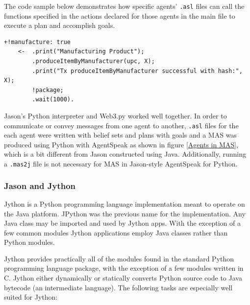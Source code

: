 \vspace{.5cm}

The code sample below demonstrates how specific agents' \texttt{.asl} files can call the functions specified in the actions declared for those agents in the main file to execute a plan and accomplish goals.

\vspace{.5cm}

\begin{lstlisting}[frame=none, numbers=none]
    +!manufacture: true
    <-  .print("Manufacturing Product");
        .produceItemByManufacturer(upc, X);
        .print("Tx produceItemByManufacturer successful with hash:", X);
        !package;
        .wait(1000).
\end{lstlisting}

\vspace{.5cm}
Jason's Python interpreter and Web3.py worked well together. In order to communicate or convey messages from one agent to another, \texttt{.asl} files for the each agent were written with belief sets and plans with goals and a \ac{MAS} was produced using Python with AgentSpeak as shown in figure \ref{Agents in MAS}, which is a bit different from Jason constructed using Java. Additionally, running a \texttt{.mas2j} file is not necessary for \ac{MAS} in Jason-style AgentSpeak for Python.

\subsubsection{Jason and Jython}

Jython is a Python programming language implementation meant to operate on the Java platform. JPython was the previous name for the implementation. Any Java class may be imported and used by Jython apps. With the exception of a few common modules Jython applications employ Java classes rather than Python modules. 

\vspace{.5cm}
Jython provides practically all of the modules found in the standard Python programming language package, with the exception of a few modules written in C. Jython either dynamically or statically converts Python source code to Java bytecode (an intermediate language). The following tasks are especially well suited for Jython:

